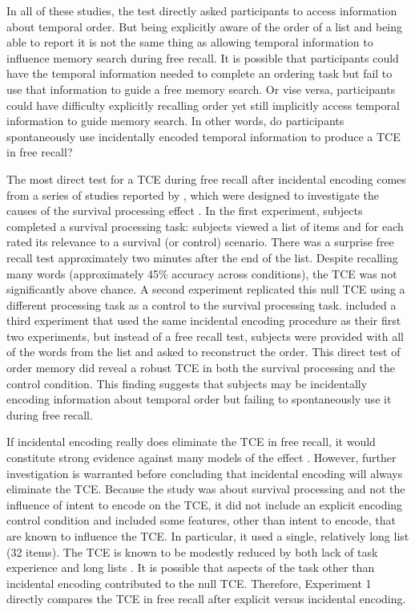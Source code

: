 \documentclass[man,natbib,floatsintext]{apa6} %
\begin{document}
\label{TODO-4}
In all of these studies, the test directly asked participants to access information about temporal order. But being explicitly aware of the order of a list and being able to report it is not the same thing as allowing temporal information to influence memory search during free recall. It is possible that participants could have the temporal information needed to complete an ordering task but fail to use that information to guide a free memory search. Or vise versa, participants could have difficulty explicitly recalling order yet still implicitly access temporal information to guide memory search. In other words, do participants spontaneously use incidentally encoded temporal information to produce a TCE in free recall? 

The most direct test for a TCE during free recall after incidental encoding comes from a series of studies reported by \citet{NairEtal17}, which were designed to investigate the causes of the survival processing effect \citep{NairEtal07}. In the first experiment, subjects completed a survival processing task: subjects viewed a list of items and for each rated its relevance to a survival (or control) scenario. There was a surprise free recall test approximately two minutes after the end of the list. Despite recalling many words (approximately 45\% accuracy across conditions), the TCE was not significantly above chance. A second experiment replicated this null TCE using a different processing task as a control to the survival processing task. \citet{NairEtal17} included a third experiment that used the same incidental encoding procedure as their first two experiments, but instead of a free recall test, subjects were provided with all of the words from the list and asked to reconstruct the order. This direct test of order memory did reveal a robust TCE in both the survival processing and the control condition. This finding suggests that subjects may be incidentally encoding information about temporal order but failing to spontaneously use it during free recall.

If incidental encoding really does eliminate the TCE in free recall, it would constitute strong evidence against many models of the effect \citep[e.g.,][]{LohnEtal14,HealKaha17}. However, further investigation is warranted before concluding that incidental encoding will always eliminate the TCE. Because the \citet{NairEtal17} study was about survival processing and not the influence of intent to encode on the TCE, it did not include an explicit encoding control condition and included some features, other than intent to encode, that are known to influence the TCE. In particular, it used a single, relatively long list (32 items). The TCE is known to be modestly reduced by both lack of task experience and long lists \citep{HealKaha17}. It is possible that aspects of the task other than incidental encoding contributed to the null TCE. Therefore, Experiment 1 directly compares the TCE in \label{TODO-3} free recall after explicit versus incidental encoding.
\color{black}
\end{document}
